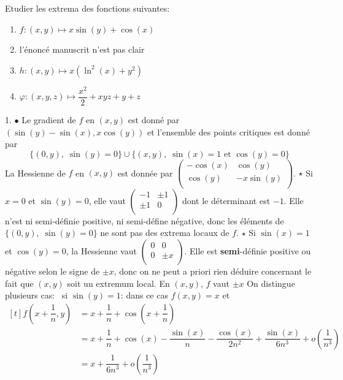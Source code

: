 \documentclass{fancybook}
\begin{document}
\begin{exercice}
Etudier les extrema des fonctions suivantes:
\begin{enumerate}
\item $\displaystyle f:(x,y)\mapsto x\sin(y) + \cos(x)$ 
\item l'énoncé manuscrit n'est pas clair
\item $\displaystyle h:(x,y)\mapsto x(\ln^2(x) + y^2)$
\item $\displaystyle \varphi:(x,y,z)\mapsto \dfrac{x^2}{2} + xyz + y +z$
\end{enumerate}
\end{exercice}
1. $\bullet$ Le gradient de $f$ en $(x,y)$ est donné par $\left( \sin(y) - \sin(x), x\cos(y)\right)$ et l'ensemble des points critiques est donné par $$ \{(0,y), \; \sin(y)=0\} \cup \{(x,y),\;\sin(x)=1 \text{ et } \cos(y)=0 \} $$
La Hessienne de $f$ en $(x,y)$ est donnée par $\left(
\begin{array}{cc}
 -\cos (x) & \cos (y) \\
 \cos (y) & -x \sin (y) \\
\end{array}
\right)$.\newline 
\newline
$\star$ Si $x=0$ et $\sin(y)=0$, elle vaut $\left(\begin{array}{cc}
 -1 & \pm 1 \\
\pm 1 & 0 \\
\end{array}\right)$ dont le déterminant est $-1$. Elle n'est ni semi-définie positive, ni semi-défine négative, donc les éléments de $\{(0,y), \; \sin(y)=0\}$ ne sont pas des extrema locaux de $f$. \newline
$\star$ Si $\sin(x)=1$ et $\cos(y)=0$, la Hessienne vaut $\left(\begin{array}{cc}
 0 & 0 \\
0 & \pm x \\
\end{array}\right)$. Elle est \textbf{semi}-définie positive ou négative selon le signe de $\pm x$, donc on ne peut a priori rien déduire concernant le fait que $(x,y)$ soit un extremum local.
En $(x,y)$, $f$ vaut $\pm x$ On distingue plusieurs cas: \newline
\textopenbullet \, si $\sin(y)=1$: dans ce cas $f(x,y)=x$ et \newline
 $\begin{aligned}[t] f(x+\dfrac{1}{n},y) &= x + \dfrac{1}{n} + \cos\left( x+\dfrac 1n \right) \\
&= x+\dfrac 1n + \cos(x) -\dfrac{\sin(x)}{n} -\dfrac{\cos(x)}{2n^2}+\dfrac{\sin(x)}{6n^3}+o\left( \dfrac{1}{n^3}\right) \\
&= x + \dfrac{1}{6n^3} + o\left( \dfrac{1}{n^3}\right) 
 \end{aligned}$ \newline
\end{document}
